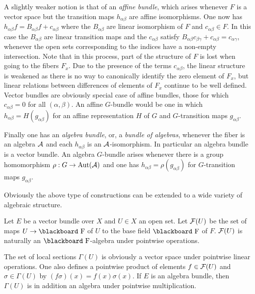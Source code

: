 \documentclass[12pt,titlepage]{article}
\def\bbf#1{\hbox{\blackboard #1}}
\def\lF{\bbf F}
\def\cA{{\cal A}}
\def\cF{{\cal F}}
\def\Aut{\hbox{Aut}}
\begin{document}
A slightly weaker notion is that of an {\em affine bundle\/}, 
%
which
arises whenever \(F\) is a vector space but the transition maps
\(h_{\alpha\beta}\) are affine isomorphisms. One now has
\(h_{\alpha\beta}f =
B_{\alpha\beta}f+ c_{\alpha\beta}\) where the \(B_{\alpha\beta}\) are
linear isomorphism of \(F\) and \(c_{\alpha\beta}\in F\). In this case
the \(B_{\alpha\beta}\) are linear transition maps and the
\(c_{\alpha\beta}\) satisfy
\(B_{\alpha\beta}c_{\beta\gamma}+c_{\alpha\beta}=c_{\alpha\gamma}\),
whenever the open sets corresponding to the indices have a 
non-empty intersection. Note that in this process, part of the structure
of \(F\) is lost when going to the fibers \(F_x\). Due to the presence
of the terms \(c_{\alpha\beta}\), the linear structure is weakened
as there is no way to canonically identify the zero
element of \(F_x\), but linear relations between differences of elements
of \(F_x\) continue to be well defined. Vector
bundles are obviously special case of affine bundles, those for which
\(c_{\alpha\beta}=0\) for all \((\alpha,\beta)\).
 An affine \(G\)-bundle would be one in which
\(h_{\alpha\beta}=H(g_{\alpha\beta})\) for an affine representation
 \(H\) of 
 \(G\) and \(G\)-transition maps \(g_{\alpha\beta}\). 

Finally one has an {\em algebra bundle\/},
%
 or, a {\em bundle of
algebras\/},
whenever the fiber is an algebra \(\cA\) and each \(h_{\alpha\beta}\) is
an \(\cA\)-isomorphism.  In particular an algebra bundle is a vector
bundle. An algebra \(G\)-bundle arises whenever there is a group
homomorphism \(\rho:G\to \Aut(\cA)\) and one has 
\(h_{\alpha\beta} =\rho(g_{\alpha\beta})\) for 
\(G\)-transition maps \(g_{\alpha\beta}\).

Obviously the above type of constructions can be
extended to a wide variety of algebraic structure.

Let \(E\) be a vector bundle over \(X\) and \(U\in X\) an open set.
Let \(\cF(U)\)
\index{\(F(U)\)@\(\cF(U)\)}%
be the set of maps \(U\to \lF\) of \(U\) to the base field
\(\lF\)
of \(F\). \(\cF(U)\)  is naturally an \(\lF\)-algebra under pointwise
operations.


The
set of local sections \(\Gamma(U)\) is obviously a vector space under
pointwise linear operations. One also defines a pointwise product of
elements \(f\in\cF(U)\) and \(\sigma\in\Gamma(U)\) by
 \((f\sigma)(x)=f(x)\sigma(x)\). 
If \(E\)
is an algebra bundle, then
\(\Gamma(U)\) is in addition an algebra under pointwise multiplication.
\end{document}
